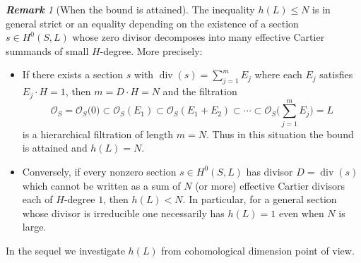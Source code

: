 \documentclass[14pt]{amsart}
\theoremstyle{plain}
\theoremstyle{definition}
\theoremstyle{remark}
\newtheorem{rem}[thm]{\bf Remark}
\theoremstyle{example}
\def \O{\mathcal{O}}
\begin{document}
\begin{rem}[When the bound is attained]
The inequality $h(L)\le N$ is in general strict or an equality depending on the
existence of a section $s\in H^0(S,L)$ whose zero divisor decomposes into many
effective Cartier summands of small $H$-degree. More precisely:
\begin{itemize}
  \item If there exists a section $s$ with $\operatorname{div}(s)=\sum_{j=1}^m E_j$
    where each $E_j$ satisfies $E_j\cdot H =1$, then $m = D\cdot H = N$ and the
    filtration
    $$
      \O_S = \O_S \bigl(0\bigr)
      \subset \O_S(E_1)
      \subset \O_S(E_1+E_2)
      \subset \cdots
      \subset \O_S\!\bigl(\sum_{j=1}^m E_j\bigr) = L
    $$
    is a hierarchical filtration of length $m=N$. Thus in this situation the bound
    is attained and $h(L)=N$.
  \item Conversely, if every nonzero section $s\in H^0(S,L)$ has divisor $D=\operatorname{div}(s)$
    which cannot be written as a sum of $N$ (or more) effective Cartier divisors each
    of $H$-degree $1$, then $h(L)<N$. In particular, for a general section whose
    divisor is irreducible one necessarily has $h(L)=1$ even when $N$ is large.
\end{itemize}
\end{rem}

In the sequel we investigate $h(L)$ from cohomological dimension point of view.
\end{document}
